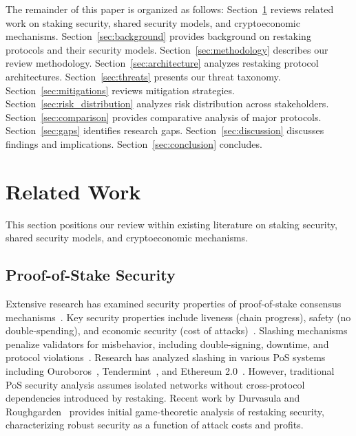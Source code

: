 \documentclass[runningheads]{llncs}
\begin{document}
The remainder of this paper is organized as follows: Section~\ref{sec:related} reviews related work on staking security, shared security models, and cryptoeconomic mechanisms. Section~\ref{sec:background} provides background on restaking protocols and their security models. Section~\ref{sec:methodology} describes our review methodology. Section~\ref{sec:architecture} analyzes restaking protocol architectures. Section~\ref{sec:threats} presents our threat taxonomy. Section~\ref{sec:mitigations} reviews mitigation strategies. Section~\ref{sec:risk_distribution} analyzes risk distribution across stakeholders. Section~\ref{sec:comparison} provides comparative analysis of major protocols. Section~\ref{sec:gaps} identifies research gaps. Section~\ref{sec:discussion} discusses findings and implications. Section~\ref{sec:conclusion} concludes.

\vspace{-0.3cm}
\section{Related Work}
\label{sec:related}

This section positions our review within existing literature on staking security, shared security models, and cryptoeconomic mechanisms.

\subsection{Proof-of-Stake Security}

Extensive research has examined security properties of proof-of-stake consensus mechanisms~\cite{buterin2014ethereum,wood2014ethereum,buterin2017casper,kiayias2017ouroboros}. Key security properties include liveness (chain progress), safety (no double-spending), and economic security (cost of attacks)~\cite{li2022survey,zhou2022state,liu2021survey}. Slashing mechanisms penalize validators for misbehavior, including double-signing, downtime, and protocol violations~\cite{atzei2017survey}. Research has analyzed slashing in various PoS systems including Ouroboros~\cite{kiayias2017ouroboros}, Tendermint~\cite{buchman2016tendermint,kwon2014tendermint}, and Ethereum 2.0~\cite{buterin2017casper}. However, traditional PoS security analysis assumes isolated networks without cross-protocol dependencies introduced by restaking. Recent work by Durvasula and Roughgarden~\cite{durvasula2024robust} provides initial game-theoretic analysis of restaking security, characterizing robust security as a function of attack costs and profits.
\end{document}
